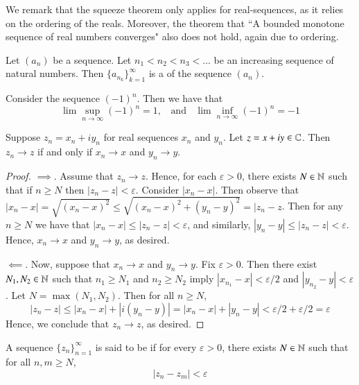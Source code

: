 \documentclass[12pt, a4paper, oneside, openright, titlepage]{book}
\begin{document}
We remark that the squeeze theorem only applies for real-sequences, as it relies on the ordering of the reals. Moreover, the theorem that ``A bounded monotone sequence of real numbers converges" also does not hold, again due to ordering.

\begin{defn}
    Let $(a_n)$ be a sequence. Let $n_1 < n_2 < n_3 < ...$ be an increasing sequence of natural numbers. Then $\{a_{n_k}\}_{k=1}^{\infty}$ is a  of the sequence $(a_n)$.
\end{defn}

\begin{eg}
    Consider the sequence $(-1)^n$. Then we have that \begin{equation*}
        \lim\sup\limits_{n\rightarrow\infty}(-1)^n = 1,\;\;\text{ and }\;\;\lim\inf\limits_{n\rightarrow\infty}(-1)^n = -1
    \end{equation*}
\end{eg}


\begin{thm}
    Suppose $z_n = x_n+iy_n$ for real sequences $x_n$ and $y_n$. Let $z = x+iy \in \mathbb C$. Then $z_n\rightarrow z$ if and only if $x_n\rightarrow x$ and $y_n\rightarrow y$.
\end{thm}
\begin{proof}
    $\implies$. Assume that $z_n\rightarrow z$. Hence, for each $\varepsilon > 0$, there exists $N \in \mathbb N$ such that if $n \geq N$ then $|z_n - z| < \varepsilon$. Consider $|x_n - x|$. Then observe that $|x_n-x| = \sqrt{(x_n-x)^2}\leq \sqrt{(x_n-x)^2+(y_n-y)^2} = |z_n - z$. Then for any $n \geq N$ we have that $|x_n - x| \leq |z_n - z| < \varepsilon$, and similarly, $|y_n - y| \leq |z_n - z| < \varepsilon$. Hence, $x_n\rightarrow x$ and $y_n\rightarrow y$, as desired.

    $\impliedby$. Now, suppose that $x_n\rightarrow x$ and $y_n\rightarrow y$. Fix $\varepsilon > 0$. Then there exist $N_1,N_2 \in \mathbb N$ such that $n_1 \geq N_1$ and $n_2 \geq N_2$ imply $|x_{n_1} - x| < \varepsilon/2$ and $|y_{n_2}-y| < \varepsilon$. Let $N = \max(N_1,N_2)$. Then for all $n \geq N$, \begin{equation*}
        |z_n - z| \leq |x_n - x| + |i(y_n - y)| = |x_n - x| + |y_n - y| < \varepsilon/2+\varepsilon/2 = \varepsilon
    \end{equation*}
    Hence, we conclude that $z_n\rightarrow z$, as desired.
\end{proof}

\begin{defn}
    A sequence $\{z_n\}_{n=1}^{\infty}$ is said to be  if for every $\varepsilon > 0$, there exists $N \in \mathbb N$ such that for all $n,m \geq N$, \begin{equation*}
        |z_n - z_m| < \varepsilon
    \end{equation*}
\end{defn}
\end{document}
